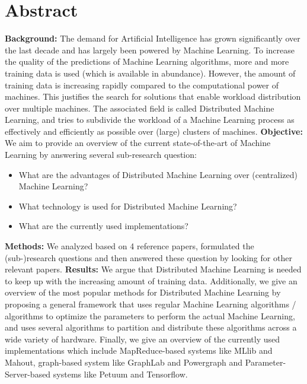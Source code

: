 \section{Abstract}
\textbf{Background:} The demand for Artificial Intelligence has grown significantly over the last decade and has largely been powered by Machine Learning. To increase the quality of the predictions of Machine Learning algorithms, more and more training data is used (which is available in abundance). However, the amount of training data is increasing rapidly compared to the computational power of machines. This justifies the search for solutions that enable workload distribution over multiple machines. The associated field is called Distributed Machine Learning, and tries to subdivide the workload of a Machine Learning process as effectively and efficiently as possible over (large) clusters of machines.
\textbf{Objective:} We aim to provide an overview of the current state-of-the-art of Machine Learning by answering several sub-research question:
\begin{itemize}
	\item What are the advantages of Distributed Machine Learning over (centralized) Machine Learning?
	\item What technology is used for Distributed Machine Learning?
	\item What are the currently used implementations?
\end{itemize}
\textbf{Methods:} We analyzed based on 4 reference papers\cite{Bal12}\cite{Die12}\cite{Xing16}\cite{Zhang16}, formulated the (sub-)research questions and then answered these question by looking for other relevant papers.
\textbf{Results:} We argue that Distributed Machine Learning is needed to keep up with the increasing amount of training data. Additionally, we give an overview of the most popular methods for Distributed Machine Learning by proposing a general framework that uses regular Machine Learning algorithms / algorithms to optimize the parameters to perform the actual Machine Learning, and uses several algorithms to partition and distribute these algorithms across a wide variety of hardware. Finally, we give an overview of the currently used implementations which include MapReduce-based systems like MLlib and Mahout, graph-based system like GraphLab and Powergraph and Parameter-Server-based systems like Petuum and Tensorflow.